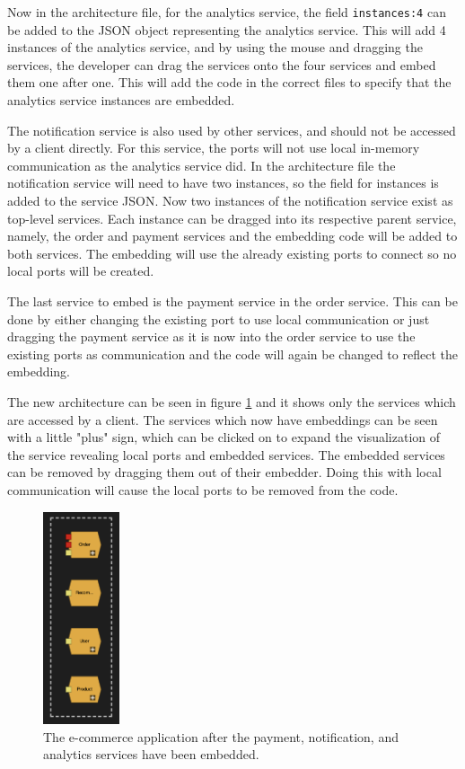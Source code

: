 Now in the architecture file, for the analytics service, the field \texttt{instances:4} can be added to the JSON object representing the analytics service. This will add 4 instances of the analytics service, and by using the mouse and dragging the services, the developer can 
drag the services onto the four services and embed them one after one. This will add the code in the correct files to specify that the analytics service instances are embedded.

The notification service is also used by other services, and should not be accessed by a client directly. For this service, the ports will not use local in-memory communication as the analytics service did.
In the architecture file the notification service will need to have two instances, so the field for instances is added to the service JSON. Now two instances of the notification service exist as top-level services. Each instance can be dragged into its respective
parent service, namely, the order and payment services and the embedding code will be added to both services. The embedding will use the already existing ports to connect so no local ports will be created.

The last service to embed is the payment service in the order service. This can be done by either changing the existing port to use local communication or just dragging the payment service
as it is now into the order service to use the existing ports as communication and the code will again be changed to reflect the embedding.

The new architecture can be seen in figure \ref*{figure:jv_embedded} and it shows only the services which are accessed by a client. The services which now have embeddings can be seen with a little "plus" sign, which can be clicked on to expand the visualization of the service revealing local ports and embedded services.
The embedded services can be removed by dragging them out of their embedder. Doing this with local communication will cause the local ports to be removed from the code.

\begin{figure}[h!]
    \center
    \includegraphics[width=0.2\textwidth]{figures/jv_embedded.png}
    \caption{The e-commerce application after the payment, notification, and analytics services have been embedded.}
    \label{figure:jv_embedded}
\end{figure}

